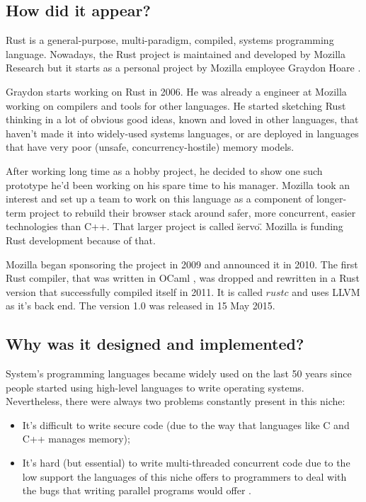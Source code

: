 \subsection{How did it appear?}

Rust  \cite{7_1} is a general-purpose,
multi-paradigm, compiled, systems programming
language. Nowadays, the Rust project is maintained and developed by Mozilla  \cite{7_2}
Research but it starts as a personal project by Mozilla employee Graydon Hoare
 \cite{7_3}  \cite{7_4}.

Graydon starts working on Rust in 2006. He was already a engineer at Mozilla
working on compilers and tools for other languages. He started sketching Rust
thinking in a lot of obvious good ideas, known and loved in other languages,
that haven't made it into widely-used systems languages, or are deployed in
languages that have very poor (unsafe, concurrency-hostile) memory models.

After working long time as a hobby project, he decided to show one such
prototype he'd been working on his spare time to his manager. Mozilla took an
interest and set up a team to work on this language as a component of
longer-term project to rebuild their browser stack around safer, more
concurrent, easier technologies than C++. That larger project is called \"servo\".
Mozilla is funding Rust development because of that.

Mozilla began sponsoring the project in 2009 and announced it in 2010. The
first Rust compiler, that was written in OCaml 
 \cite{7_5}, was dropped and rewritten in a
Rust version that successfully compiled itself in 2011. It is called $rustc$
and uses LLVM  \cite{7_6} as it's back end. The
version 1.0  \cite{7_7} was released in 15 May
2015.

\subsection{Why was it designed and implemented?}

System's programming languages became widely used on the last 50 years since
people started using high-level languages to write operating systems.
Nevertheless, there were always two problems constantly present in this niche:

\begin{itemize}
    \item It's difficult to write secure code (due to the way that languages like C and
          C++ manages memory);
    \item It's hard (but essential) to write multi-threaded concurrent code due to the
          low support the languages of this niche offers to programmers to deal
          with the bugs that writing parallel programs would offer  \cite{7_8}.
\end{itemize}

